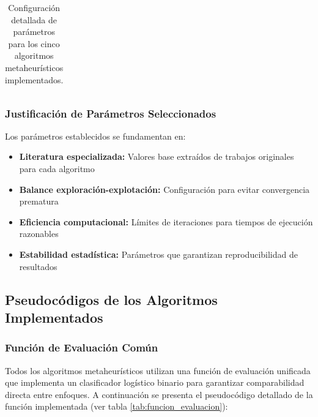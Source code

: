 \begin{table}[htbp]
{\begin{tabular}{|l|l|l|l|l|l|}
\hline
\end{tabular}
}
\caption{Configuración detallada de parámetros para los cinco algoritmos metaheurísticos implementados.}
\label{tab:configuracion_algoritmos_metaheuristicos}
\end{table}

\subsubsection{Justificación de Parámetros Seleccionados}

Los parámetros establecidos se fundamentan en:

\begin{itemize}
    \item \textbf{Literatura especializada:} Valores base extraídos de trabajos originales para cada algoritmo
    \item \textbf{Balance exploración-explotación:} Configuración para evitar convergencia prematura
    \item \textbf{Eficiencia computacional:} Límites de iteraciones para tiempos de ejecución razonables
    \item \textbf{Estabilidad estadística:} Parámetros que garantizan reproducibilidad de resultados
\end{itemize}

\subsection{Pseudocódigos de los Algoritmos Implementados}
\label{subsec:pseudocodigos_algoritmos}

\subsubsection{Función de Evaluación Común}

Todos los algoritmos metaheurísticos utilizan una función de evaluación unificada que implementa un clasificador logístico binario para garantizar comparabilidad directa entre enfoques. A continuación se presenta el pseudocódigo detallado de la función implementada (ver tabla \ref{tab:funcion_evaluacion}):

